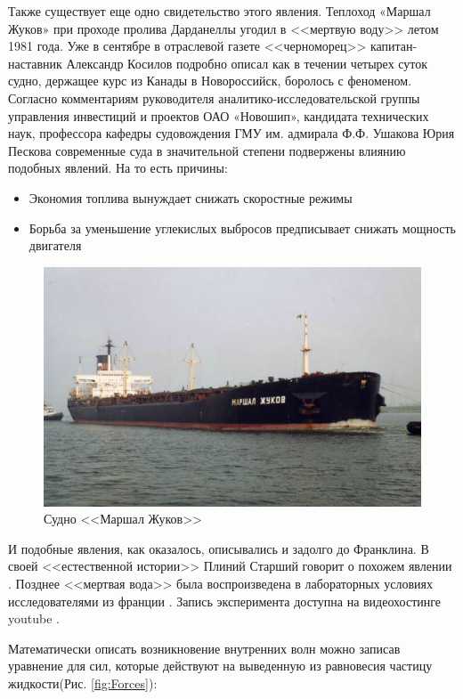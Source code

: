 Также существует еще одно свидетельство этого явления. Теплоход «Маршал Жуков» при проходе пролива Дарданеллы угодил в <<мертвую воду>> летом 1981 года. Уже в сентябре в отраслевой газете <<черноморец>> капитан-наставник Александр Косилов подробно описал как в течении четырех суток судно, держащее курс из Канады в Новороссийск, боролось с феноменом. Согласно комментариям руководителя аналитико-исследовательской группы управления инвестиций и проектов ОАО «Новошип», кандидата технических наук, профессора кафедры судовождения ГМУ им. адмирала Ф.Ф. Ушакова Юрия Пескова современные суда в значительной степени подвержены влиянию подобных явлений\cite{MorVest}. На то есть причины:

\begin{itemize}
    \item Экономия топлива вынуждает снижать скоростные режимы
    \item Борьба за уменьшение углекислых выбросов предписывает снижать мощность двигателя
\end{itemize}


\begin{figure}
    \centering
    \includegraphics[scale=0.5]{Figs/marshl_jukov.jpg}
    \caption{Судно <<Маршал Жуков>>}
    \label{fig:jukov}
\end{figure}

И подобные явления, как оказалось, описывались и задолго до Франклина. В своей <<естественной истории>> Плиний Старший говорит о похожем явлении \cite{Plinii}. Позднее <<мертвая вода>> была воспроизведена в лабораторных условиях исследователями из франции \cite{deadWater}. Запись эксперимента доступна на видеохостинге youtube \cite{deadWaterVideo}.


Математически описать возникновение внутренних волн можно записав уравнение для сил, которые действуют на выведенную из равновесия частицу жидкости(Рис. \ref{fig:Forces}):

